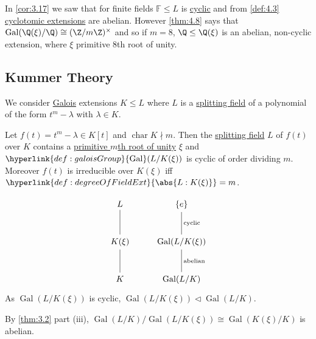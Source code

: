 \documentclass{article}
\DeclareMathOperator{\chara}{char}
\DeclareMathOperator{\Gal}{Gal}
\newcommand{\F}{\mathbb{F}}
\begin{document}

\begin{eg}
    In \cref{cor:3.17} we saw that for finite fields $\F \leq L$ is \hyperlink{def:cyclic}{cyclic} and from \cref{def:4.3} \hyperlink{def:cycloExt}{cyclotomic extensions} are abelian.
    However \cref{thm:4.8} says that $\Gal(\Q(\xi)/\Q) \cong (\Z/m\Z)^\times$ and so if $m=8$, $\Q \leq \Q(\xi)$ is an abelian, non-cyclic extension, where $\xi$ primitive $8$th root of unity.
\end{eg}

\subsection{Kummer Theory}
We consider \hyperlink{def:galoisExt}{Galois} extensions $K \leq L$ where $L$ is a \hyperlink{def:splitting}{splitting field} of a polynomial of the form $t^m - \lambda$ with $\lambda \in K$.

\begin{nthm}\label{thm:4.10}
    Let $f(t) = t^m - \lambda \in K[t]$ and $\chara K \nmid m$.
    Then the \hyperlink{def:splitting}{splitting field} $L$ of $f(t)$ over $K$ contains a \hyperlink{def:primRoot}{primitive $m$th root of unity} $\xi$ and $\hyperlink{def:galoisGroup}{\Gal}(L/K(\xi))$ is cyclic of order dividing $m$.
    Moreover $f(t)$ is irreducible over $K(\xi)$ iff $\hyperlink{def:degreeOfFieldExt}{\abs{L:K(\xi)}} = m$.
\end{nthm}

\begin{remark}
    \begin{equation*}
        \begin{tikzcd}[row sep=large]
            L \arrow[d, no head] & \{e\} \arrow[d, no head, "\text{cyclic}"] \\
            K(\xi) \arrow[d, no head] & \Gal(L/K(\xi)) \arrow[d, no head, "\text{abelian}"] \\
            K & \Gal(L/K)
        \end{tikzcd}
    \end{equation*}
    As $\Gal(L/K(\xi))$ is cyclic, $\Gal(L/K(\xi)) \lhd \Gal(L/K)$.

    By \cref{thm:3.2} part (iii), $\Gal(L/K)/\Gal(L/K(\xi)) \cong \Gal(K(\xi)/K)$ is abelian.
\end{remark}
\end{document}
